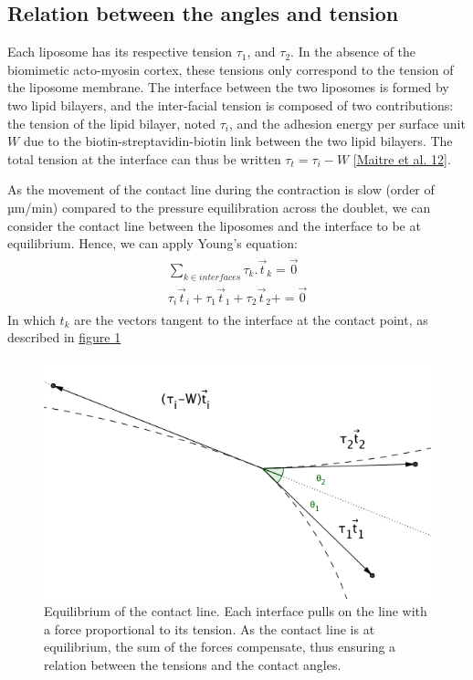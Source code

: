 \documentclass[A4paperpaper,11pt,english]{sphinxmanual}
\begin{document}
\subsection{Relation between the angles and tension}
\label{index-latex:relation-between-the-angles-and-tension}
Each liposome has its respective tension \(\tau_1\), and \(\tau_2\).  In the absence
of the biomimetic acto-myosin cortex, these tensions only correspond to the
tension of the liposome membrane. The interface between the two liposomes is
formed by two lipid bilayers, and the inter-facial tension is composed of two contributions:
the tension of the lipid bilayer, noted \(\tau_i\), and the
adhesion energy per surface unit \(W\) due to the biotin-streptavidin-biotin link
between the two lipid bilayers. The total tension at the interface can thus be
written \(\tau_t = \tau_i -W\) {\hyperref[index-latex:maitre2012]{{[}Maitre et al. 12{]}}}.

As the movement of the contact line during the contraction is slow (order of
µm/min) compared to the pressure equilibration across the doublet, we can consider
the contact line between the liposomes and the interface to be at equilibrium.
Hence, we can apply Young's equation:
\label{index-latex:equation-eqa401}\begin{gather}
\begin{split}\sum_{k \in interfaces} \tau_k. \vec t_k  = \vec 0 \\
\tau_i \vec t_i + \tau_1 \vec t_1 + \tau_2 \vec t_2 + = \vec 0\end{split}\label{index-latex-eqa401}
\end{gather}
In which \(t_k\) are the vectors tangent to the interface at the contact point, as described in \hyperref[index-latex:fig-yd]{figure  \ref*{index-latex:fig-yd}}
\begin{figure}[htbp]
\centering
\capstart

\includegraphics[width=0.600\linewidth]{yd.png}
\caption{Equilibrium of the contact line. Each interface pulls on the line with a
force proportional to its tension. As the contact line is at equilibrium,
the sum of the forces compensate, thus ensuring  a relation between the tensions and the contact angles.}\label{index-latex:fig-yd}\end{figure}
\end{document}
